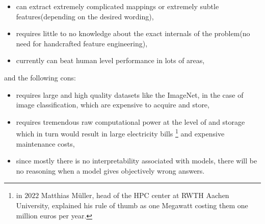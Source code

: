 \begin{itemize}
  \item can extract extremely complicated mappings or extremely subtle features(depending on the desired wording),
  \item requires little to no knowledge about the exact internals of the problem(no need for handcrafted feature engineering),
  \item currently can beat human level performance in lots of areas,
\end{itemize}

and the following cons:

\begin{itemize}
  \item requires large and high quality datasets like the ImageNet\cite{Deng2009}, in the case of image classification, which are expensive to acquire and store,
  \item requires tremendous raw computational power at the level of \cite{Meuer} and storage which in turn would result in large electricity bills
  \footnote{in $2022$ Matthias M\"{u}ller, head of the \ac{HPC} center at RWTH Aachen University, explained his rule of thumb as  
  one Megawatt costing them one million euros per year.} and expensive maintenance costs,
  \item since mostly there is no interpretability associated with models, there will be no reasoning when a model gives objectively wrong answers. 
\end{itemize}

